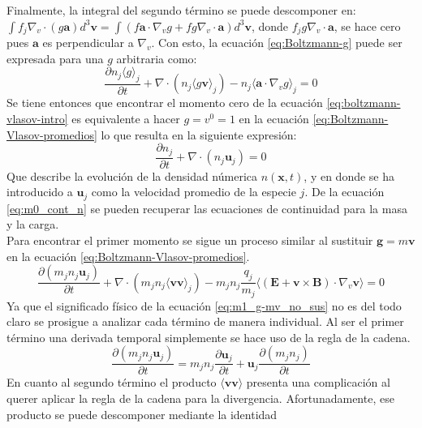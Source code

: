 \documentclass[../tesis_main_file.tex]{subfiles}
\begin{document}
Finalmente, la integral del segundo término se puede descomponer en: $\int f_j\nabla _v \cdot (g\textbf{a})d^3\textbf{v} = \int (f\textbf{a} \cdot \nabla_v g + fg\nabla_v \cdot \textbf{a})d^3\textbf{v}$, donde $f_jg\nabla_v \cdot \textbf{a}$, se hace cero pues $\textbf{a}$ es perpendicular a $\nabla_v$. Con esto, la ecuación \ref{eq:Boltzmann-g} puede ser expresada para una $g$ arbitraria como:
\begin{equation}
\label{eq:Boltzmann-Vlasov-promedios}
\frac{\partial n_j \langle g \rangle_j}{\partial t}+\nabla \cdot (n_j \langle g \textbf{v} \rangle_j)-n_j \langle \textbf{a}\cdot \nabla_v g \rangle_j=0
\end{equation}
Se tiene entonces que encontrar el momento cero de la ecuación \ref{eq:boltzmann-vlasov-intro} es equivalente a hacer $g=v^0=1$ en la ecuación \ref{eq:Boltzmann-Vlasov-promedios} lo que resulta en la siguiente expresión:
\begin{equation}
\label{eq:m0_cont_n}
\frac{\partial n_j}{\partial t}+\nabla \cdot (n_j \textbf{u}_j)=0
\end{equation}
Que describe la evolución de la densidad númerica $n(\textbf{x},t)$, y en donde se ha introducido a $\textbf{u}_j$ como la velocidad promedio de la especie $j$. De la ecuación \ref{eq:m0_cont_n} se pueden recuperar las ecuaciones de continuidad para la masa y la carga.\\
Para encontrar el primer momento se sigue un proceso similar al sustituir $\textbf{g}=m\textbf{v}$ en la ecuación \ref{eq:Boltzmann-Vlasov-promedios}.
\begin{equation}
\label{eq:m1_g-mv_no_sus}
\frac{\partial (m_jn_j\textbf{u}_j)}{\partial t}+\nabla \cdot (m_jn_j\langle \textbf{v}\textbf{v} \rangle_j)-m_jn_j\frac{q_j}{m_j}\langle (\textbf{E}+\textbf{v}\times \textbf{B})\cdot \nabla_v\textbf{v}\rangle=0
\end{equation}
Ya que el significado físico de la ecuación \ref{eq:m1_g-mv_no_sus} no es del todo claro se prosigue a analizar cada término de manera individual.
Al ser el primer término una derivada temporal simplemente se hace uso de la regla de la cadena.
\begin{equation}
\label{eq:m1_primer_termino}
\frac{\partial (m_jn_j\textbf{u}_j)}{\partial t}= m_jn_j\frac{\partial \textbf{u}_j}{\partial t}+ \textbf{u}_j\frac{\partial (m_jn_j)}{\partial t}
\end{equation}
En cuanto al segundo término el producto $\langle \textbf{v} \textbf{v} \rangle $ presenta una complicación al querer aplicar la regla de la cadena para la divergencia. Afortunadamente, ese producto se puede descomponer mediante la identidad
\end{document}
